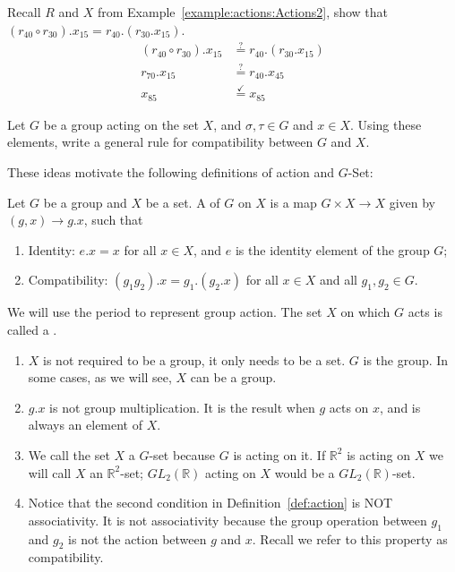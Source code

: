 \begin{example}\label{example:actions:Compat2} Recall $R$ and $X$ from Example~\ref{example:actions:Actions2}, show that $(r_{40} \circ r_{30}).x_{15}=r_{40}.(r_{30}.x_{15})$.
\begin{equation*}
\begin{split}
(r_{40} \circ r_{30}).x_{15}&\stackrel{?}{=}r_{40}.(r_{30}.x_{15}) \\
 r_{70}.x_{15}&\stackrel{?}{=}r_{40}.x_{45}\\
x_{85}&\stackrel{\checkmark}{=}x_{85}
\end{split}
\end{equation*}
\end{example}

\begin{exercise}\label{exercise:actions:Compat3} Let $G$ be a group acting on the set $X$, and $\sigma, \tau \in G$ and $x \in X$. Using these elements, write a general rule for compatibility between $G$ and $X$.
\end{exercise}

These ideas motivate the following definitions of action and $G$-Set:

\begin{defn}\label{def:action}
Let $G$ be a group and $X$ be a set. A  of $G$ on $X$ is a map $G\times X\rightarrow X$ given by $(g, x)\rightarrow g.x$, such that
\begin{enumerate}[(1)]
\item Identity: $e.x = x$ for all $x\in X$, and $e$ is the identity element of the group $G$;
\item Compatibility: $(g_1g_2).x = g_1.(g_2.x)$ for all $x\in X$ and all $g_1, g_2 \in G$.
\end{enumerate}
We will use the period to represent group action. The set $X$ on which $G$ acts is called a  .
\end{defn}

\begin{rem}
\begin{enumerate}[(1)]
\item $X$ is not required to be a group, it only needs to be a set. $G$ is the group. In some cases, as we will see, $X$ can be a group.
\item $g.x$ is not group multiplication. It is the result when $g$ acts on $x$, and is always an element of $X$.
\item We call the set $X$ a $G$-set because $G$ is acting on it. If $\mathbb{R}^2$ is acting on $X$ we will call $X$ an $\mathbb{R}^2$-set; $GL_2 (\mathbb{R})$ acting on $X$ would be a $GL_2 (\mathbb{R})$-set.
\item Notice that the second condition in Definition~\ref{def:action} is NOT associativity. It is not associativity because the group operation between $g_1$ and $g_2$ is not the action between $g$ and $x$. Recall we refer to this property as compatibility.
\end{enumerate}
\end{rem}

